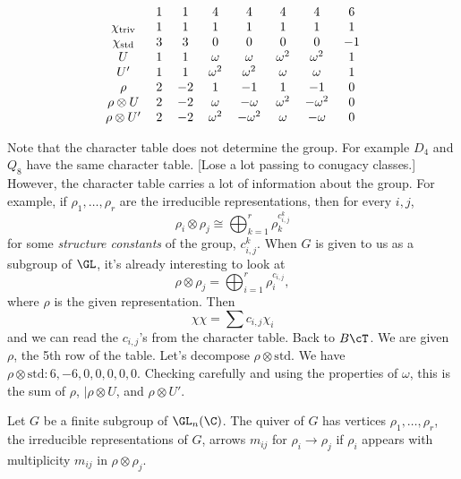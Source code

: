 \begin{ex}
\begin{enumerate}[(i)]
	\[
	\begin{tabular}{cccccccc}
	& 1 & 1 & 4 & 4 & 4 & 4 & 6 \\
	$\chi_{\text{triv}}$  & 1 & 1 & 1 & 1 & 1 & 1 & 1 \\
	$\chi_{\text{std}}$  & 3 & 3 & 0 & 0 & 0 & 0 & $-1$ \\
	$U$ & 1 & 1 & $\omega$ & $\omega$ & $\omega^2$ & $\omega^2$ & 1 \\
	$U'$ & 1 & 1 & $\omega^2$ & $\omega^2$ & $\omega$ & $\omega$ & 1 \\
	$\rho$ & 2 & $-2$ & 1 & $-1$ & 1 & $-1$ & 0 \\
	$\rho \otimes U$ & 2& $-2$ & $\omega$ & $-\omega$ & $\omega^2$ & $-\omega^2$ & 0 \\
	$\rho \otimes U'$ & 2 & $-2$ & $\omega^2$ & $-\omega^2$ & $\omega$ & $-\omega$ & 0
	\end{tabular}
	\]
\end{enumerate}
\end{ex}



Note that the character table does not determine the group. For example $D_4$ and $Q_8$ have the same character table. [Lose a lot passing to conugacy classes.] However, the character table carries a lot of information about the group. For example, if $\rho_1,\ldots,\rho_r$ are the irreducible representations, then for every $i,j$, 
	\[
	\rho_i \otimes \rho_j \cong \bigoplus_{k=1}^r \rho_k^{c_{i,j}^k}
	\]
for some \emph{structure constants} of the group, $c_{i,j}^k$. When $G$ is given to us as a subgroup of $\GL$, it's already interesting to look at
	\[
	\rho \otimes \rho_j = \bigoplus_{i=1}^r \rho_i^{c_{i,j}},
	\]
where $\rho$ is the given representation. Then
	\[
	\chi \chi = \sum c_{i,j} \chi_i
	\]
and we can read the $c_{i,j}$'s from the character table. Back to $B\cT$. We are given $\rho$, the 5th row of the table. Let's decompose $\rho \otimes \text{std}$. We have $\rho \otimes \text{std}: 6,-6,0,0,0,0,0$. Checking carefully and using the properties of $\omega$, this is the sum of $\rho$, $|\rho \otimes U$, and $\rho \otimes U'$. 



\begin{dfn}[\mc Quiver]
Let $G$ be a finite subgroup of $\GL_n(\C)$. The \mc quiver of $G$ has vertices $\rho_1,\ldots,\rho_r$, the irreducible representations of $G$, arrows $m_{ij}$ for $\rho_i \to \rho_j$ if $\rho_i$ appears with multiplicity $m_{ij}$ in $\rho \otimes \rho_j$. 
\end{dfn}


